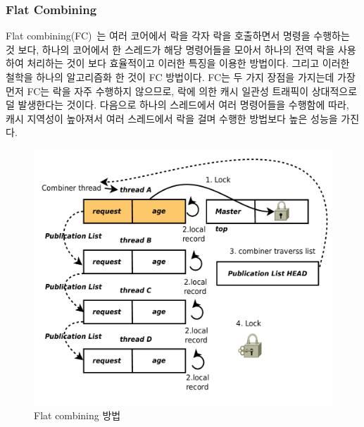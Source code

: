 \subsubsection{Flat Combining}

Flat combining(FC)~\cite{Hendler2010FC}는 여러 코어에서 락을 각자 락을 호출하면서 명령을 수행하는 것 보다, 
하나의 코어에서 한 스레드가 해당 명령어들을 모아서 하나의 전역 락을 사용하여 처리하는 것이 보다 
효율적이고 이러한 특징을 이용한 방법이다.
그리고 이러한 철학을 하나의 알고리즘화 한 것이 FC 방법이다.
FC는 두 가지 장점을 가지는데 가장 먼저 FC는 락을 자주 수행하지 않으므로, 락에 의한 
캐시 일관성 트래픽이 상대적으로 덜 발생한다는 것이다.
다음으로 하나의 스레드에서 여러 명령어들을 수행함에 따라, 캐시 지역성이 높아져서 
여러 스레드에서 락을 걸며 수행한 방법보다 높은 성능을 가진다.

\begin{figure}[h!]
    \centering
    \includegraphics[width=1\textwidth]{fig/FC/FC}
    \caption{Flat combining 방법}
  \label{fig:FC}
\end{figure}


